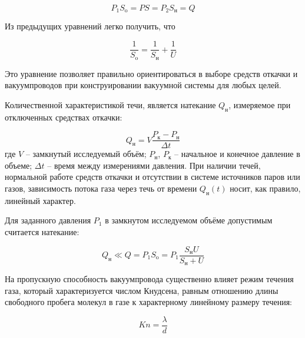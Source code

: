 \documentclass[a4paper,12pt]{article}
\begin{document}
\begin{equation}
	P_1S_{\text{o}} = PS = P_2S_{\text{н}} = Q
\end{equation}

Из предыдущих уравнений легко получить, что

\begin{equation}
	\frac{1}{S_{\text{o}}} = \frac{1}{S_{\text{н}}} + \frac{1}{U}
\end{equation}

Это уравнение позволяет правильно ориентироваться в выборе средств
откачки и вакуумпроводов при конструировании вакуумной системы для
любых целей.

Количественной характеристикой течи, является натекание $Q_{\text{н}}$, измеряемое при отключенных средствах откачки:

\begin{equation}
	Q_{\text{н}} = V \frac{P_{\text{к}} - P_{\text{н}}}{\Delta t}
\end{equation}
где $V$ -- замкнутый исследуемый объём; $P_{\text{н}}$, $P_{\text{к}}$ -- начальное и конечное давление в объеме; $\Delta t$ -- время между измерениями давления. При наличии течей, нормальной работе средств откачки и отсутствии в системе
источников паров или газов, зависимость потока газа через течь от времени $Q_{\text{н}}(t)$ носит, как правило, линейный характер.

Для заданного давления $P_1$ в замкнутом исследуемом объёме допустимым считается натекание:

\begin{equation}
	Q_{\text{н}} \ll Q = P_1 S_{\text{o}} = P_1 \frac{S_{\text{н}} U}{S_{\text{н}} + U}
\end{equation}

На пропускную способность вакуумпровода существенно влияет
режим течения газа, который характеризуется числом Кнудсена, равным
отношению длины свободного пробега молекул в газе к характерному
линейному размеру течения:

\begin{equation}
	Kn = \frac{\lambda}{d}
\end{equation}
\end{document}
